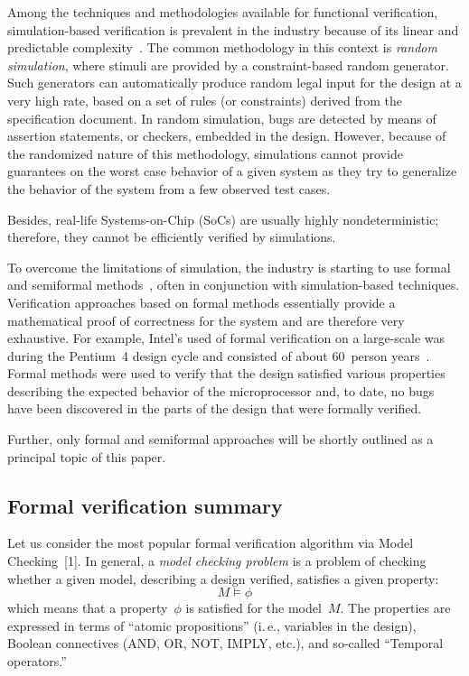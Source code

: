 \begin{multicols}{2}
       Among the techniques and methodologies available for functional verification, 
simulation-based verification is prevalent in the industry because of its linear and predictable 
complexity~\cite{2fr}. The common methodology in this context is \textit{random simulation}, 
where stimuli are provided by a constraint-based random generator. Such generators can 
automatically produce random legal input for the design at a very high rate, based on a set of 
rules (or constraints) derived from the specification document. In random simulation, bugs are 
detected by means of assertion statements, or checkers, embedded in the design. However, 
because of the randomized nature of this methodology, simulations cannot provide guarantees on 
the worst case behavior of a given system as they try to generalize the behavior of the system 
from a few observed test cases.
       
       Besides, real-life Systems-on-Chip (SoCs) are usually highly nondeterministic; therefore, 
they cannot be efficiently verified by simulations. 
    
To overcome the limitations of simulation, the industry is starting to use formal and semiformal 
methods~\cite{1fr, 2fr, 3fr}, often in conjunction with simulation-based techniques. Verification 
approaches based on formal methods essentially provide a mathematical proof of correctness for 
the system and are therefore very exhaustive. For example, Intel's used of formal verification on a 
large-scale was during the Pentium~4 design cycle and consisted of about 60~person 
years~\cite{3fr}. Formal methods were used to verify that the design satisfied various properties 
describing the expected behavior of the microprocessor and, to date, no bugs have been 
discovered in the parts of the design that were formally verified.

Further, only formal and semiformal approaches will be shortly outlined
as a principal topic of this  paper.
   
\subsection{Formal verification summary} %
       
\noindent
Let us consider the most popular formal verification algorithm via Model Checking~[1].
In general, a \textit{model checking problem} is a problem of checking whether a given model, 
describing a design verified, satisfies a given property:
$$
M\models \phi
$$
 which means that a property~$\phi$ is satisfied for the model~$M$. The properties are expressed in 
terms of ``atomic propositions'' (i.\,e., variables in the design), Boolean connectives (AND, OR, 
NOT, IMPLY, etc.), and so-called ``Temporal operators.''


\end{multicols}
